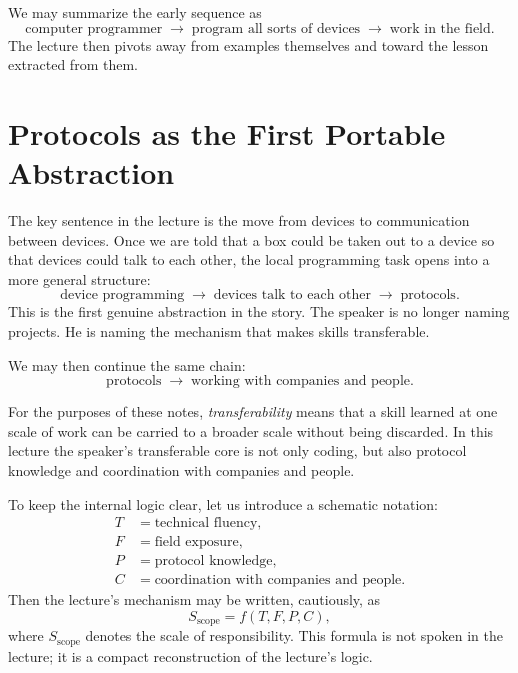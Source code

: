 We may summarize the early sequence as
\begin{equation}
\text{computer programmer}
\;\to\;
\text{program all sorts of devices}
\;\to\;
\text{work in the field}.
\end{equation}
The lecture then pivots away from examples themselves and toward the lesson extracted from them.

\section{Protocols as the First Portable Abstraction}

The key sentence in the lecture is the move from devices to communication between devices. Once we are told that a box could be taken out to a device so that devices could talk to each other, the local programming task opens into a more general structure:
\begin{equation}
\text{device programming}
\;\to\;
\text{devices talk to each other}
\;\to\;
\text{protocols}.
\end{equation}
This is the first genuine abstraction in the story. The speaker is no longer naming projects. He is naming the mechanism that makes skills transferable.

We may then continue the same chain:
\begin{equation}
\text{protocols}
\;\to\;
\text{working with companies and people}.
\end{equation}

\begin{definition}
For the purposes of these notes, \emph{transferability} means that a skill learned at one scale of work can be carried to a broader scale without being discarded. In this lecture the speaker's transferable core is not only coding, but also protocol knowledge and coordination with companies and people.
\end{definition}

To keep the internal logic clear, let us introduce a schematic notation:
\begin{align}
T &= \text{technical fluency}, \\
F &= \text{field exposure}, \\
P &= \text{protocol knowledge}, \\
C &= \text{coordination with companies and people}.
\end{align}
Then the lecture's mechanism may be written, cautiously, as
\begin{equation}
S_{\text{scope}} = f(T,F,P,C),
\end{equation}
where \(S_{\text{scope}}\) denotes the scale of responsibility. This formula is not spoken in the lecture; it is a compact reconstruction of the lecture's logic.

